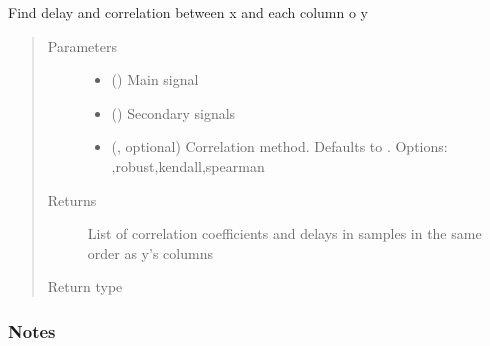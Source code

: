 \documentclass[letterpaper,10pt,english]{sphinxmanual}
\begin{document}
\begin{fulllineitems}
\label{\detokenize{correlator:correlator.correlate}}
\sphinxAtStartPar
Find delay and correlation between x and each column o y
\begin{quote}\begin{description}
\item[{Parameters}] \leavevmode\begin{itemize}
\item {} 
\sphinxAtStartPar
{} () \textendash{} Main signal

\item {} 
\sphinxAtStartPar
{} () \textendash{} Secondary signals

\item {} 
\sphinxAtStartPar
{} (, optional) \textendash{} Correlation method. Defaults to . Options: ,\textasciigrave{}robust\textasciigrave{},\textasciigrave{}kendall\textasciigrave{},\textasciigrave{}spearman\textasciigrave{}

\end{itemize}

\item[{Returns}] \leavevmode
\sphinxAtStartPar
List of correlation coefficients and delays in samples in the same order as y’s columns

\item[{Return type}] \leavevmode
\sphinxAtStartPar
{}

\end{description}\end{quote}
\subsubsection*{Notes}


\end{fulllineitems}
\end{document}
